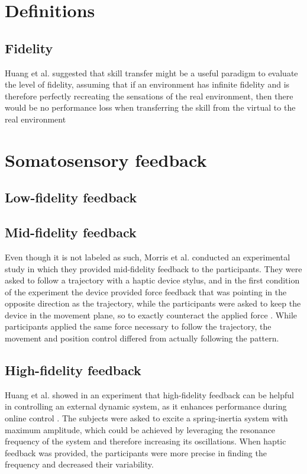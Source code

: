 \documentclass[conference]{IEEEtran}
\begin{document}
\section{Definitions}
\subsection{Fidelity}
Huang et al. suggested that skill transfer might be a useful paradigm to evaluate the level of fidelity, assuming that if an environment has infinite fidelity and is therefore perfectly recreating the sensations of the real environment, then there would be no performance loss when transferring the skill from the virtual to the real environment \cite{Huang2006HumanCoordination}

\section{Somatosensory feedback}
\subsection{Low-fidelity feedback}

\subsection{Mid-fidelity feedback}
Even though it is not labeled as such, Morris et al. conducted an experimental study in which they provided mid-fidelity feedback to the participants. They were asked to follow a trajectory with a haptic device stylus, and in the first condition of the experiment the device provided force feedback that was pointing in the opposite direction as the trajectory, while the participants were asked to keep the device in the movement plane, so to exactly counteract the applied force \cite{Morris2007HapticLearning}. While participants applied the same force necessary to follow the trajectory, the movement and position control differed from actually following the pattern.



\subsection{High-fidelity feedback}
Huang et al. showed in an experiment that high-fidelity feedback can be helpful in controlling an external dynamic system, as it enhances performance during online control \cite{Huang2007VisualManipulation}. The subjects were asked to excite a spring-inertia system with maximum amplitude, which could be achieved by leveraging the resonance frequency of the system and therefore increasing its oscillations. When haptic feedback was provided, the participants were more precise in finding the frequency and decreased their variability.
\end{document}
